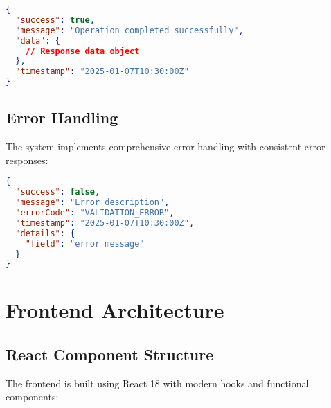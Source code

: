 \documentclass[12pt,a4paper]{article}
\begin{document}
\begin{lstlisting}[language=JSON, caption=Standard API Response Format]
{
  "success": true,
  "message": "Operation completed successfully",
  "data": {
    // Response data object
  },
  "timestamp": "2025-01-07T10:30:00Z"
}
\end{lstlisting}

\subsection{Error Handling}

The system implements comprehensive error handling with consistent error responses:

\begin{lstlisting}[language=JSON, caption=Error Response Format]
{
  "success": false,
  "message": "Error description",
  "errorCode": "VALIDATION_ERROR",
  "timestamp": "2025-01-07T10:30:00Z",
  "details": {
    "field": "error message"
  }
}
\end{lstlisting}

\section{Frontend Architecture}

\subsection{React Component Structure}

The frontend is built using React 18 with modern hooks and functional components:
\end{document}
